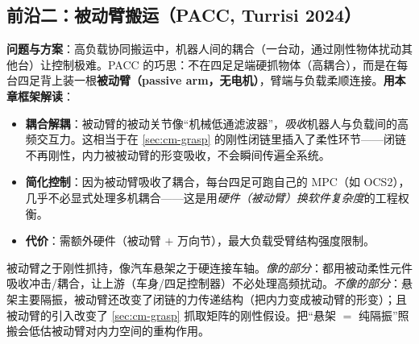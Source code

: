 \subsection{前沿二：被动臂搬运（PACC, Turrisi 2024）}
\label{sec:cm-frontier-pacc}
\textbf{问题与方案}：高负载协同搬运中，机器人间的耦合（一台动，通过刚性物体扰动其他台）让控制极难。PACC 的巧思\cite{turrisi2024pacc}：不在四足足端硬抓物体（高耦合），而是在每台四足背上装一根\textbf{被动臂（passive arm，无电机）}，臂端与负载柔顺连接。\textbf{用本章框架解读}：
\begin{itemize}
  \item \textbf{耦合解耦}：被动臂的被动关节像“机械低通滤波器”，\emph{吸收}机器人与负载间的高频交互力。这相当于在 \cref{sec:cm-grasp} 的刚性闭链里插入了柔性环节——闭链不再刚性，内力被被动臂的形变吸收，不会瞬间传遍全系统。
  \item \textbf{简化控制}：因为被动臂吸收了耦合，每台四足可跑自己的 MPC（如 OCS2），几乎不必显式处理多机耦合——这是用\emph{硬件（被动臂）换软件复杂度}的工程权衡。
  \item \textbf{代价}：需额外硬件（被动臂 $+$ 万向节），最大负载受臂结构强度限制。
\end{itemize}

\begin{note}
被动臂之于刚性抓持，像汽车悬架之于硬连接车轴。\emph{像的部分}：都用被动柔性元件吸收冲击/耦合，让上游（车身/四足控制器）不必处理高频扰动。\emph{不像的部分}：悬架主要隔振，被动臂还改变了闭链的力传递结构（把内力变成被动臂的形变）；且被动臂的引入改变了 \cref{sec:cm-grasp} 抓取矩阵的刚性假设。把“悬架 $=$ 纯隔振”照搬会低估被动臂对内力空间的重构作用。
\end{note}

